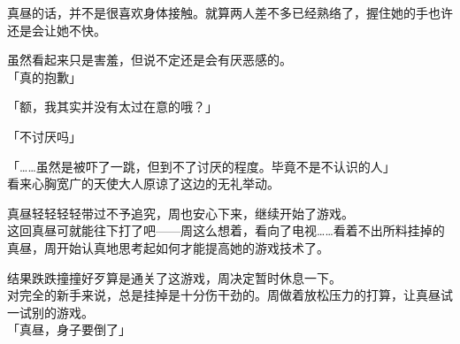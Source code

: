 真昼的话，并不是很喜欢身体接触。就算两人差不多已经熟络了，握住她的手也许还是会让她不快。

虽然看起来只是害羞，但说不定还是会有厌恶感的。\\

「真的抱歉」

「额，我其实并没有太过在意的哦？」

「不讨厌吗」

「……虽然是被吓了一跳，但到不了讨厌的程度。毕竟不是不认识的人」\\

看来心胸宽广的天使大人原谅了这边的无礼举动。

真昼轻轻轻轻带过不予追究，周也安心下来，继续开始了游戏。\\

这回真昼可就能往下打了吧——周这么想着，看向了电视……看着不出所料挂掉的真昼，周开始认真地思考起如何才能提高她的游戏技术了。



结果跌跌撞撞好歹算是通关了这游戏，周决定暂时休息一下。\\

对完全的新手来说，总是挂掉是十分伤干劲的。周做着放松压力的打算，让真昼试一试别的游戏。\\

「真昼，身子要倒了」\\

